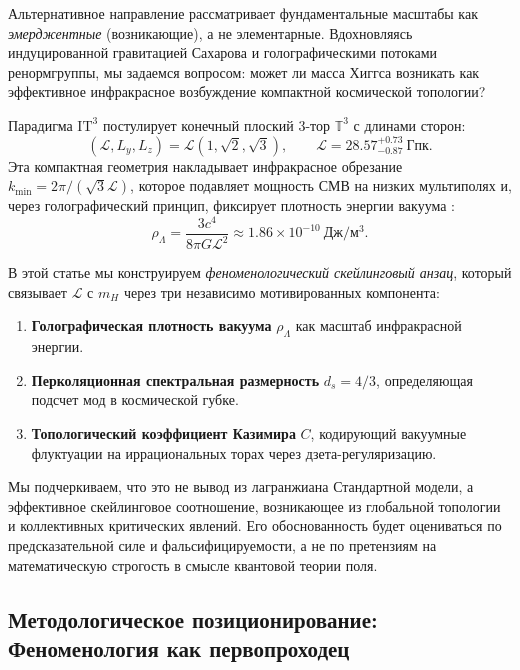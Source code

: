 \documentclass[11pt,a4paper]{article}
\newcommand{\ITthree}{\ensuremath{\mathrm{IT}^3}}
\newcommand{\Ltop}{\ensuremath{\mathcal{L}}}
\newcommand{\rhoLambda}{\ensuremath{\rho_\Lambda}}
\begin{document}
Альтернативное направление рассматривает фундаментальные масштабы как \textit{эмерджентные} (возникающие), а не элементарные. Вдохновляясь индуцированной гравитацией Сахарова и голографическими потоками ренормгруппы, мы задаемся вопросом: может ли масса Хиггса возникать как эффективное инфракрасное возбуждение компактной космической топологии?

Парадигма $\ITthree$ постулирует конечный плоский 3-тор $\mathbb{T}^3$ с длинами сторон:
\begin{equation}
(\Ltop, L_y, L_z) = \Ltop \left(1, \sqrt{2}, \sqrt{3}\right), \qquad 
\Ltop = 28.57^{+0.73}_{-0.87}~\mathrm{Гпк}.
\label{eq:topology}
\end{equation}
Эта компактная геометрия накладывает инфракрасное обрезание $k_{\min} = 2\pi/(\sqrt{3}\Ltop)$, которое подавляет мощность СМВ на низких мультиполях \citep{Logvinovich2026a} и, через голографический принцип, фиксирует плотность энергии вакуума \citep{Logvinovich2026g}:
\begin{equation}
\rhoLambda = \frac{3c^4}{8\pi G \Ltop^2} \approx 1.86 \times 10^{-10}~\mathrm{Дж/м^3}.
\label{eq:rhoLambda}
\end{equation}

В этой статье мы конструируем \textit{феноменологический скейлинговый анзац}, который связывает $\Ltop$ с $m_H$ через три независимо мотивированных компонента:
\begin{enumerate}
    \item \textbf{Голографическая плотность вакуума} $\rhoLambda$ как масштаб инфракрасной энергии.
    \item \textbf{Перколяционная спектральная размерность} $d_s = 4/3$, определяющая подсчет мод в космической губке.
    \item \textbf{Топологический коэффициент Казимира} $C$, кодирующий вакуумные флуктуации на иррациональных торах через дзета-регуляризацию.
\end{enumerate}

Мы подчеркиваем, что это не вывод из лагранжиана Стандартной модели, а эффективное скейлинговое соотношение, возникающее из глобальной топологии и коллективных критических явлений. Его обоснованность будет оцениваться по предсказательной силе и фальсифицируемости, а не по претензиям на математическую строгость в смысле квантовой теории поля.

\subsection*{Методологическое позиционирование: Феноменология как первопроходец}
\label{subsec:methodology}
\end{document}

